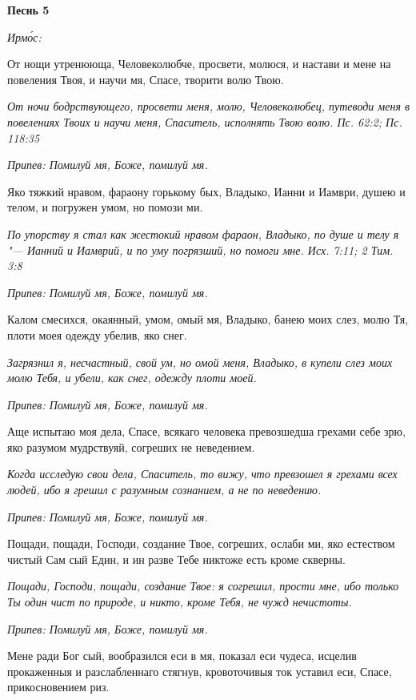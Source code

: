 \bfseries Песнь 5\normalfont{}


\itshape Ирмо́с:\normalfont{}


От нощи утренююща, Человеколюбче, просвети, молюся, и настави и мене на повеления Твоя, и научи мя, Спасе, творити волю Твою.


\itshape От ночи бодрствующего, просвети меня, молю, Человеколюбец, путеводи меня в повелениях Твоих и научи меня, Спаситель, исполнять Твою волю. Пс. 62:2; Пс. 118:35\normalfont{}


\itshape Припев:\normalfont{} Помилуй мя, Боже, помилуй мя.


Яко тяжкий нравом, фараону горькому бых, Владыко, Ианни и Иамври, душею и телом, и погружен умом, но помози ми.


\itshape По упорству я стал как жестокий нравом фараон, Владыко, по душе и телу я "--- Ианний и Иамврий, и по уму погрязший, но помоги мне. Исх. 7:11; 2 Тим. 3:8\normalfont{}


\itshape Припев:\normalfont{} Помилуй мя, Боже, помилуй мя.


Калом смесихся, окаянный, умом, омый мя, Владыко, банею моих слез, молю Тя, плоти моея одежду убелив, яко снег.


\itshape Загрязнил я, несчастный, свой ум, но омой меня, Владыко, в купели слез моих молю Тебя, и убели, как снег, одежду плоти моей.\normalfont{}


\itshape Припев:\normalfont{} Помилуй мя, Боже, помилуй мя.


Аще испытаю моя дела, Спасе, всякаго человека превозшедша грехами себе зрю, яко разумом мудрствуяй, согреших не неведением.


\itshape Когда исследую свои дела, Спаситель, то вижу, что превзошел я грехами всех людей, ибо я грешил с разумным сознанием, а не по неведению.\normalfont{}


\itshape Припев:\normalfont{} Помилуй мя, Боже, помилуй мя.


Пощади, пощади, Господи, создание Твое, согреших, ослаби ми, яко естеством чистый Сам сый Един, и ин разве Тебе никтоже есть кроме скверны.


\itshape Пощади, Господи, пощади, создание Твое: я согрешил, прости мне, ибо только Ты один чист по природе, и никто, кроме Тебя, не чужд нечистоты.\normalfont{}


\itshape Припев:\normalfont{} Помилуй мя, Боже, помилуй мя.


Мене ради Бог сый, вообразился еси в мя, показал еси чудеса, исцелив прокаженныя и разслабленнаго стягнув, кровоточивыя ток уставил еси, Спасе, прикосновением риз.


